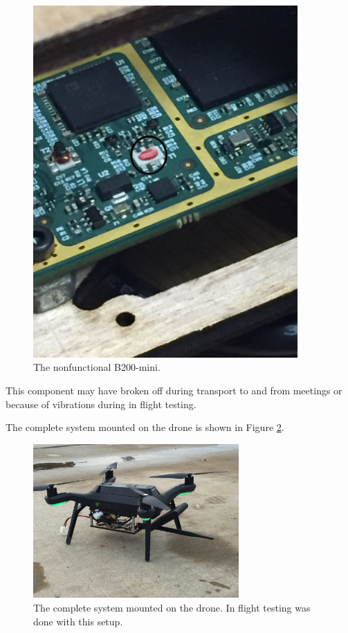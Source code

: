 \begin{figure}[ht!]
\begin{minipage}{0.5\textwidth}
\centering
\includegraphics[width=0.9\textwidth]{img/broken_mini_labeled.jpg}
\caption{The nonfunctional B200-mini.}
\label{fig:broken_mini}
\end{minipage}
\end{figure}

This component may have broken off during transport to and from meetings or because of vibrations during in flight testing. \par

The complete system mounted on the drone is shown in Figure \ref{fig:drone_and_box}.
\begin{figure}[ht!]
	\centering
	\includegraphics[width=0.70\textwidth]{img/drone_and_box.jpg}
	\caption{The complete system mounted on the drone. In flight testing was done with this setup.}
	\label{fig:drone_and_box}
\end{figure}
\par

